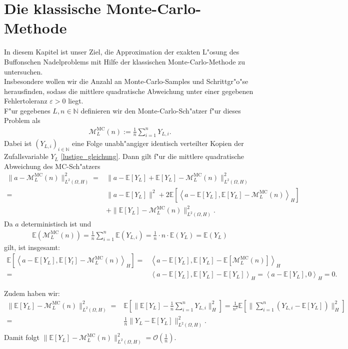 \section{Die klassische Monte-Carlo-Methode}
In diesem Kapitel ist unser Ziel, die Approximation der exakten L"osung des Buffonschen Nadelproblems mit Hilfe der klassischen Monte-Carlo-Methode zu untersuchen.\\
Insbesondere wollen wir die Anzahl an Monte-Carlo-Samples und Schrittgr"o"se herausfinden, sodass die mittlere quadratische Abweichung unter einer gegebenen Fehlertoleranz $\varepsilon>0$ liegt.\\
F"ur gegebenes $L,n\in\mathbb{N}$ definieren wir den Monte-Carlo-Sch"atzer f"ur dieses Problem als
\begin{align*}
\mathcal{M}_L^{\text{MC}}(n):=\frac{1}{n}\sum_{i=1}^n  Y_{L,i}.
\end{align*}
Dabei ist $(Y_{L,i})_{i\in\mathbb{N}}$ eine Folge unabh"angiger identisch verteilter Kopien der Zufallsvariable $Y_L$ \eqref{lustige_gleichung}.
Dann gilt f"ur die mittlere quadratische Abweichung des MC-Sch"atzers
\begin{align*}
\parallel a-\mathcal{M}_L^{\text{MC}}(n)\parallel_{L^2(\Omega,H)}^2=&\parallel a-\mathbb{E}[Y_L]+\mathbb{E}[Y_L]-\mathcal{M}_L^{\text{MC}}(n)\parallel_{L^2(\Omega,H)}^2\
\\=&\parallel a- \mathbb{E}[Y_L]\parallel^2+2\mathbb{E}\left[\left<a-\mathbb{E}[Y_L],\mathbb{E}[Y_L]-\mathcal{M}_L^{\text{MC}}(n)\right >_H\right]\\&+\parallel\mathbb{E}[Y_L]-\mathcal{M}_L^{\text{MC}}(n)\parallel_{L^2(\Omega,H)}^2.
\end{align*}
Da $a$ deterministisch ist und 
\begin{align*}
\mathbb{E}\left(\mathcal{M}_L^{\text{MC}}(n)\right)=\frac{1}{n}\sum_{i=1}^n\mathbb{E}(Y_{L,i})=\frac{1}{n}\cdot n \cdot \mathbb{E}(Y_L)=\mathbb{E}(Y_L)
\end{align*}
gilt, ist insgesamt:
\begin{align*}
\mathbb{E}\left[\left<a-\mathbb{E}[Y_L],\mathbb{E}[Y_l]-\mathcal{M}_L^{\text{MC}}(n)\right >_H\right]=&\left<a-\mathbb{E}[Y_L],\mathbb{E}[Y_L]-\mathbb{E}[\mathcal{M}_L^{\text{MC}}(n)]\right>_H
\\=&\left<a-\mathbb{E}[Y_L],\mathbb{E}[Y_L]-\mathbb{E}[Y_L]\right>_H=\left<a-\mathbb{E}[Y_L],0\right>_H=0.
\end{align*}

Zudem haben wir:
\begin{align*}
\parallel \mathbb{E}[Y_L]-\mathcal{M}_L^{\text{MC}}(n)\parallel_{L^2(\Omega,H)}^2=&\mathbb{E}\left[\parallel \mathbb{E}[Y_L]-\frac{1}{n}\sum_{i=1}^nY_{L,i}\parallel_H^2\right]=\frac{1}{n^2}\mathbb{E}\left[\parallel\sum_{i=1}^n(Y_{L,i}-\mathbb{E}[Y_L])\parallel_H^2\right]\\=&\frac{1}{n}\parallel Y_L-\mathbb{E}[Y_L]\parallel^2_{L^2(\Omega,H)}.\\
\end{align*}
Damit folgt $ \parallel \mathbb{E}[Y_L]-\mathcal{M}_L^{\text{MC}}(n)\parallel_{L^2(\Omega,H)}^2=\mathcal{O}\left(\frac{1}{n}\right)$.

